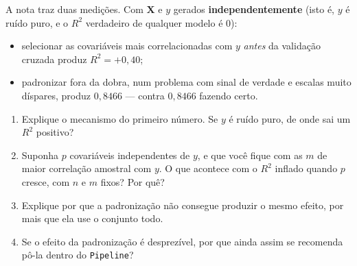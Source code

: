 \documentclass[11pt,a4paper]{article}
\begin{document}
\begin{exercicio}
A nota traz duas medições. Com $\bm X$ e $y$ gerados \textbf{independentemente}
(isto é, $y$ é ruído puro, e o $R^2$ verdadeiro de qualquer modelo é $0$):
\begin{itemize}[leftmargin=1.4cm]
  \item selecionar as covariáveis mais correlacionadas com $y$ \emph{antes} da
        validação cruzada produz $R^2 = +0{,}40$;
  \item padronizar fora da dobra, num problema com sinal de verdade e escalas
        muito díspares, produz $0{,}8466$ --- contra $0{,}8466$ fazendo certo.
\end{itemize}
\begin{enumerate}[label=(\alph*),leftmargin=1.1cm]
  \item Explique o mecanismo do primeiro número. Se $y$ é ruído puro, de onde sai
        um $R^2$ positivo?
  \item Suponha $p$ covariáveis independentes de $y$, e que você fique com as $m$
        de maior correlação amostral com $y$. O que acontece com o $R^2$ inflado
        quando $p$ cresce, com $n$ e $m$ fixos? Por quê?
  \item Explique por que a padronização não consegue produzir o mesmo efeito, por
        mais que ela use o conjunto todo.
  \item Se o efeito da padronização é desprezível, por que ainda assim se
        recomenda pô-la dentro do \texttt{Pipeline}?
\end{enumerate}
\end{exercicio}
\end{document}
